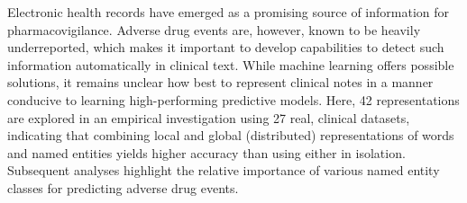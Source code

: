 Electronic health records have emerged as a promising source of information for pharmacovigilance. Adverse drug events are, however, known to be heavily underreported, which makes it important to develop capabilities to detect such information automatically in clinical text. While machine learning offers possible solutions, it remains unclear how best to represent clinical notes in a manner conducive to learning high-performing predictive models. Here, 42 representations are explored in an empirical investigation using 27 real, clinical datasets, indicating that combining local and global (distributed) representations of words and named entities yields higher accuracy than using either in isolation. Subsequent analyses highlight the relative importance of various named entity classes for predicting adverse drug events.
